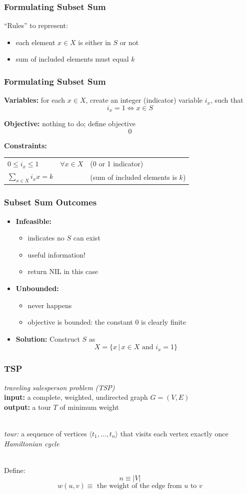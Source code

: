 \documentclass[10pt,aspectratio=169]{beamer}
\newcommand{\stanza}{ \\~\ }
\begin{document}
\begin{frame} \frametitle{Formulating Subset Sum}
  ``Rules'' to represent:
    \begin{itemize}
      \item each element $x \in X$ is either in $S$ or not
      \item sum of included elements must equal $k$
    \end{itemize}
\end{frame}


\begin{frame} \frametitle{Formulating Subset Sum}
  \textbf{Variables:}
  for each $x \in X$, create an integer (indicator) variable $i_x$, such that
  \[ i_x = 1 \Leftrightarrow x \in S \]
  
  \textbf{Objective:} nothing to do; define objective
  \[ 0 \]
  
  \textbf{Constraints:}

  \begin{tabular}{lll}
    $0 \leq i_x \leq 1$ & $\forall x \in X$ & (0 or 1 indicator) \\
    $\sum_{x \in X} i_x x = k$ & & (sum of included elements is $k$)
  \end{tabular}
\end{frame}


\begin{frame} \frametitle{Subset Sum Outcomes}
  \begin{itemize}
    \item \textbf{Infeasible:}
      \begin{itemize}
      \item indicates no $S$ can exist
      \item useful information!
      \item return NIL in this case
      \end{itemize}
    \item \textbf{Unbounded:}
    \begin{itemize}
      \item never happens
      \item objective is bounded: the constant 0 is clearly finite
    \end{itemize}
    \item \textbf{Solution:} Construct $S$ as
      \[ X = \{ x \,|\, x \in X \text{ and } i_x=1 \} \]
    \end{itemize}
\end{frame}

\begin{frame} \frametitle{TSP}
    \emph{traveling salesperson problem (TSP)} \\
    \textbf{input:} a complete, weighted, undirected graph $G=(V, E)$ \\
    \textbf{output:} a tour $T$ of minimum weight
    \stanza

    \emph{tour:} a sequence of vertices $\langle t_1, \ldots, t_n \rangle$
    that visits each vertex exactly once \emph{Hamiltonian cycle}
    \stanza
  
    Define: \\
    \[ n \equiv |V| \]
    \[ w(u, v) \equiv \text{ the weight of the edge from } u \text{ to } v \]
  \end{frame}
  
\end{document}
